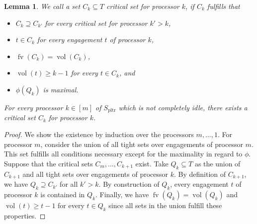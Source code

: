 \documentclass[a4paper]{article}
\DeclareMathOperator{\pltr}{pltr}
\DeclareMathOperator{\fv}{fv}
\DeclareMathOperator{\vol}{vol}
\newtheorem{lemma}[theorem]{Lemma}
\begin{document}
\begin{lemma}
  We call a set $C_k \subseteq T$ \emph{critical set for processor $k$}, if $C_k$ fulfills that
  \begin{itemize}
    \item
      $C_k \supseteq C_{k'}$ for every critical set for processor $k' > k$,
    \item
      $t \in C_k$ for every engagement $t$ of processor $k$,
    \item
      $\fv(C_k) = \vol(C_k)$,
    \item
      $\vol(t) \geq k - 1$ for every $t \in C_k$, and
    \item
      $\phi(Q_k)$ is maximal.
  \end{itemize}
  For every processor $k \in [m]$ of $S_{\pltr}$ which is not completely idle, there exists a critical set $C_k$ for processor $k$.

\end{lemma}
\begin{proof}
  We show the existence by induction over the processors $m, \ldots, 1$.
  For processor $m$, consider the union of all tight sets over engagements of processor $m$.
  This set fulfills all conditions necessary except for the maximality in regard to $\phi$.
  Suppose that the critical sets $C_m, \ldots, C_{k+1}$ exist.
  Take $Q_k \subseteq T$ as the union of $C_{k+1}$ and all tight sets over engagements of processor $k$.
  By definition of $C_{k+1}$, we have $Q_k \supseteq C_{k'}$ for all $k' > k$.
  By construction of $Q_k$, every engagement $t$ of processor $k$ is contained in $Q_k$.
  Finally, we have $\fv(Q_k) = \vol(Q_k)$ and $\vol(t) \geq t-1$ for every $t \in Q_k$ since all sets in the union fulfill these properties.
\end{proof}
\end{document}
